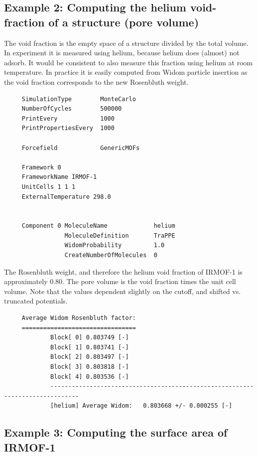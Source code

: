 \subsection*{Example 2: Computing the helium void-fraction of a structure (pore volume)}

The void fraction is the empty space of a structure divided by the total volume. In experiment it
is measured using helium, because helium does (almost) not adsorb. It would be consistent to also
measure this fraction using helium at room temperature. In practice it is easily computed from
Widom particle insertion as the void fraction corresponds to the new Rosenbluth weight.
\begin{tiny}
\begin{verbatim}
     SimulationType        MonteCarlo
     NumberOfCycles        500000
     PrintEvery            1000
     PrintPropertiesEvery  1000
     
     Forcefield            GenericMOFs
     
     Framework 0
     FrameworkName IRMOF-1
     UnitCells 1 1 1
     ExternalTemperature 298.0
     
     
     Component 0 MoleculeName             helium
                 MoleculeDefinition       TraPPE
                 WidomProbability         1.0
                 CreateNumberOfMolecules  0
\end{verbatim}
\end{tiny}

The Rosenbluth weight, and therefore the helium void fraction of IRMOF-1 is approximately 0.80.
The pore volume is the void fraction times the unit cell volume. Note that the values dependent
slightly on the cutoff, and shifted vs. truncated potentials.
\begin{tiny}
\begin{verbatim}
     Average Widom Rosenbluth factor:
     ================================
             Block[ 0] 0.803749 [-]
             Block[ 1] 0.803741 [-]
             Block[ 2] 0.803497 [-]
             Block[ 3] 0.803818 [-]
             Block[ 4] 0.803536 [-]
             ------------------------------------------------------------------------------
             [helium] Average Widom:   0.803668 +/- 0.000255 [-]
\end{verbatim}
\end{tiny}

\subsection*{Example 3: Computing the surface area of IRMOF-1}

